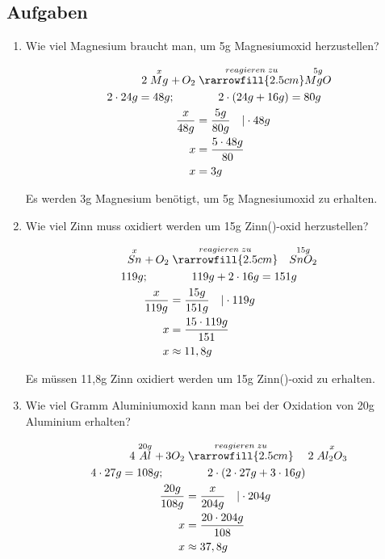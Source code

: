 \subsection{Aufgaben}
\begin{enumerate}
\item Wie viel Magnesium braucht man, um 5g Magnesiumoxid herzustellen?

\begin{align}
2\stackrel{x}{Mg} +\, {O_2}		&\stackrel{reagieren\;zu}{\rarrowfill{2.5cm}} \stackrel{5g}{MgO} \\
2\cdot 24g=48g;			\qquad	&\qquad 2\cdot (24g+16g)=80g \\
\frac{x}{48g}					&= \frac{5g}{80g}\quad\vert \cdot 48g \\
x								&= \frac{5\cdot 48g}{80} \\
x								&= 3g
\end{align}

Es werden 3g Magnesium benötigt, um 5g Magnesiumoxid zu erhalten.
\item Wie viel Zinn muss oxidiert werden um 15g Zinn()-oxid herzustellen?

\begin{align}
\stackrel{x}{Sn} +\, {O_2}		&\stackrel{reagieren\;zu}{\rarrowfill{2.5cm}}\quad \stackrel{15g}{SnO_2} \\
119g;					\qquad	&\qquad 119g+2\cdot 16g=151g \\
\frac{x}{119g}					&= \frac{15g}{151g}\quad\vert \cdot 119g \\
x								&= \frac{15\cdot 119g}{151} \\
x								&\approx 11,8g
\end{align}

Es müssen 11,8g Zinn oxidiert werden um 15g Zinn()-oxid zu erhalten.
\item Wie viel Gramm Aluminiumoxid kann man bei der Oxidation von 20g Aluminium erhalten?

\begin{align}
4\stackrel{20g}{Al} +\, {3O_2}		&\stackrel{reagieren\;zu}{\rarrowfill{2.5cm}}\quad 2\stackrel{x}{Al_2O_3} \\
4\cdot 27g=108g;			\qquad	&\qquad 2\cdot (2\cdot 27g+3\cdot 16g) \\
\frac{20g}{108g}					&= \frac{x}{204g}\quad\vert \cdot 204g \\
x									&= \frac{20\cdot 204g}{108} \\
x									&\approx 37,8g
\end{align}


\end{enumerate}

